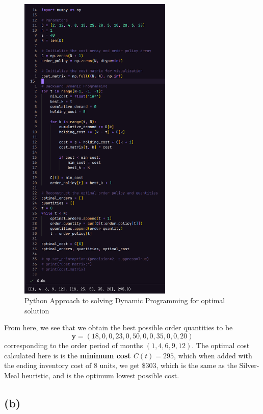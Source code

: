 \documentclass[12pt]{article}
\begin{document}
\begin{figure}[H]
    \centering
    \includegraphics[width=0.65\textwidth]{Images/dpcode.png}
    \caption{Python Approach to solving Dynamic Programming for optimal solution}
    \label{fig:2-dpcode}
\end{figure} 

\noindent From here, we see that we obtain the best possible order quantities to be \begin{equation*}
    \mathbf{y} = \left( 18 , 0 , 0 , 23 , 0 , 50 , 0 , 0 , 35 , 0 , 0 , 20 \right)
\end{equation*} corresponding to the order period of months $(1, 4, 6, 9, 12)$. The optimal cost calculated here is is the \textbf{minimum cost $C(t) = 295$}, which when added with the ending inventory cost of 8 units, we get $\$303$, which is the same as the Silver-Meal heuristic, and is the optimum lowest possible cost. 

\subsection*{(b)}   
\end{document}
